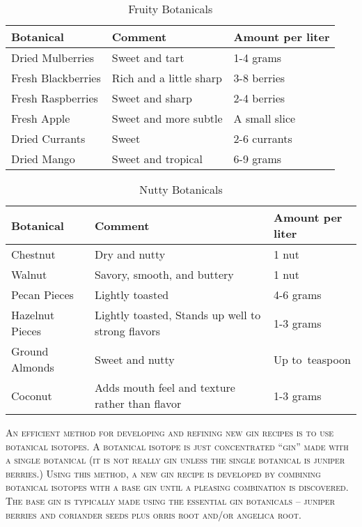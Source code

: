 \documentclass[letterpaper]{recipePMG}
\newcommand{\half}{\nicefrac{1}{2} \,}
\begin{document}
\begin{table}[H]
    \centering
    \caption{Fruity Botanicals}
    \begin{tabular}{@{}p{1.25in}p{3in}p{1.25in}@{}}
        \toprule
      Botanical &  Comment & Amount per liter \\
        \midrule
		Dried Mulberries & Sweet and tart & 1-4 grams \\
		Fresh Blackberries & Rich and a little sharp &  3-8 berries \\
		Fresh Raspberries & Sweet and sharp & 2-4 berries \\
		Fresh Apple & Sweet and more subtle & A small slice \\
		Dried Currants & Sweet & 2-6 currants \\
		Dried Mango & Sweet and tropical & 6-9 grams \\
\end{tabular}
    \label{tab:fruity}
\end{table}

\begin{table}[H]
    \centering
    \caption{Nutty Botanicals}
    \begin{tabular}{@{}p{1.25in}p{3in}p{1.25in}@{}}
        \toprule
      Botanical &  Comment & Amount per liter \\
        \midrule
		Chestnut & Dry and nutty & 1 nut \\
		Walnut	& Savory, smooth, and buttery & 1 nut \\
		Pecan Pieces & Lightly toasted & 4-6 grams \\
		Hazelnut Pieces & Lightly toasted, Stands up well to strong flavors & 1-3 grams \\
		Ground Almonds & Sweet and nutty & Up to \half teaspoon \\
		Coconut & Adds mouth feel and texture rather than flavor & 1-3 grams \\

\end{tabular}
    \label{tab:nutty}
\end{table}	

\newpage


\textsc{An efficient method for developing and refining new gin recipes is to use botanical isotopes. A botanical isotope is just concentrated ``gin'' made with a single botanical (it is not really gin unless the single botanical is juniper berries.) Using this method, a new gin recipe is developed by combining botanical isotopes with a base gin until a pleasing combination is discovered. The base gin is typically made using the essential gin botanicals -- juniper berries and coriander seeds plus orris root and/or angelica root.} 
\end{document}
